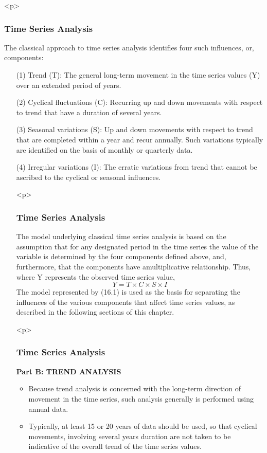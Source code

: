 \documentclass{beamer}
\begin{document}
<p>
\frametitle{Time Series Analysis}
The classical approach to time series
analysis identifies four such influences, or, components:
\begin{itemize}
\item[(1)] Trend (T): The general long-term movement in the time series values (Y) over an extended period of years.
\item[(2)] Cyclical fluctuations (C): Recurring up and down movements with respect to trend that have a duration of
several years.
\item[(3)] Seasonal variations (S): Up and down movements with respect to trend that are completed within a year and
recur annually. Such variations typically are identified on the basis of monthly or quarterly data.
\item[(4)] Irregular variations (I): The erratic variations from trend that cannot be ascribed to the cyclical or seasonal
influences.

<p>
\frametitle{Time Series Analysis}
The model underlying classical time series analysis is based on the assumption that for any designated
period in the time series the value of the variable is determined by the four components defined above, and,
furthermore, that the components have amultiplicative relationship. Thus, where Y represents the observed time
series value,
\[Y = T \times  C \times  S \times  I \]
The model represented by (16.1) is used as the basis for separating the influences of the various components
that affect time series values, as described in the following sections of this chapter.


<p>
\frametitle{Time Series Analysis}
\textbf{Part B: TREND ANALYSIS}
\begin{itemize}
\item Because trend analysis is concerned with the long-term direction of movement in the time series, such
analysis generally is performed using annual data. 
\item Typically, at least 15 or 20 years of data should be used, so
that cyclical movements, involving several years duration are not taken to be indicative of the overall trend of
the time series values.
\end{itemize}


\end{itemize}
\end{document}
